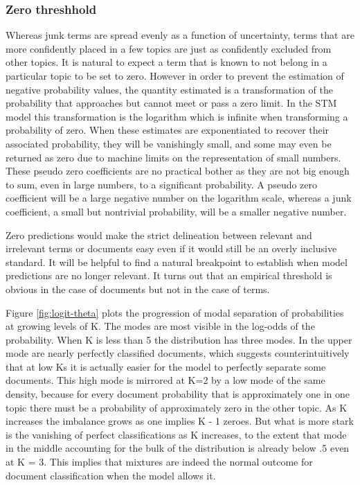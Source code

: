 \documentclass[]{book}
\theoremstyle{definition}
\theoremstyle{definition}
\theoremstyle{definition}
\theoremstyle{remark}
\begin{document}
\hypertarget{zero-threshhold}{%
\subsubsection{Zero threshhold}\label{zero-threshhold}}

Whereas junk terms are spread evenly as a function of uncertainty, terms
that are more confidently placed in a few topics are just as confidently
excluded from other topics. It is natural to expect a term that is known
to not belong in a particular topic to be set to zero. However in order
to prevent the estimation of negative probability values, the quantity
estimated is a transformation of the probability that approaches but
cannot meet or pass a zero limit. In the STM model this transformation
is the logarithm which is infinite when transforming a probability of
zero. When these estimates are exponentiated to recover their associated
probability, they will be vanishingly small, and some may even be
returned as zero due to machine limits on the representation of small
numbers. These pseudo zero coefficients are no practical bother as they
are not big enough to sum, even in large numbers, to a significant
probability. A pseudo zero coefficient will be a large negative number
on the logarithm scale, whereas a junk coefficient, a small but
nontrivial probability, will be a smaller negative number.

Zero predictions would make the strict delineation between relevant and
irrelevant terms or documents easy even if it would still be an overly
inclusive standard. It will be helpful to find a natural breakpoint to
establish when model predictions are no longer relevant. It turns out
that an empirical threshold is obvious in the case of documents but not
in the case of terms.

Figure \ref{fig:logit-theta} plots the progression of modal separation
of probabilities at growing levels of K. The modes are most visible in
the log-odds of the probability. When K is less than 5 the distribution
has three modes. In the upper mode are nearly perfectly classified
documents, which suggests counterintuitively that at low Ks it is
actually easier for the model to perfectly separate some documents. This
high mode is mirrored at K=2 by a low mode of the same density, because
for every document probability that is approximately one in one topic
there must be a probability of approximately zero in the other topic. As
K increases the imbalance grows as one implies K - 1 zeroes. But what is
more stark is the vanishing of perfect classifications as K increases,
to the extent that mode in the middle accounting for the bulk of the
distribution is already below .5 even at K = 3. This implies that
mixtures are indeed the normal outcome for document classification when
the model allows it.
\end{document}

